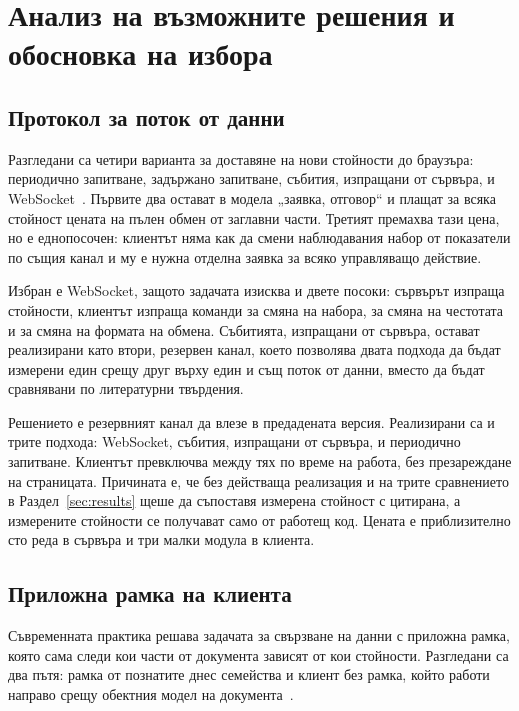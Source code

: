 \section{Анализ на възможните решения и обосновка на избора}
\label{sec:alternatives}

\subsection{Протокол за поток от данни}

Разгледани са четири варианта за доставяне на нови стойности до браузъра: периодично
запитване, задържано запитване, събития, изпращани от сървъра, и
WebSocket~\cite{rfc6455}. Първите два остават в модела „заявка, отговор“ и плащат за
всяка стойност цената на пълен обмен от заглавни части. Третият премахва тази цена, но е
еднопосочен: клиентът няма как да смени наблюдавания набор от показатели по същия канал и
му е нужна отделна заявка за всяко управляващо действие.

Избран е WebSocket, защото задачата изисква и двете посоки: сървърът изпраща стойности,
клиентът изпраща команди за смяна на набора, за смяна на честотата и за смяна на формата
на обмена. Събитията, изпращани от сървъра, остават реализирани като втори, резервен
канал, което позволява двата подхода да бъдат измерени един срещу друг върху един и същ
поток от данни, вместо да бъдат сравнявани по литературни твърдения.

Решението е резервният канал да влезе в предадената версия. Реализирани са и трите
подхода: WebSocket, събития, изпращани от сървъра, и периодично запитване. Клиентът
превключва между тях по време на работа, без презареждане на страницата. Причината е, че
без действаща реализация и на трите сравнението в Раздел~\ref{sec:results} щеше да
съпоставя измерена стойност с цитирана, а измерените стойности се получават само от
работещ код. Цената е приблизително сто реда в сървъра и три малки модула в клиента.

\subsection{Приложна рамка на клиента}

Съвременната практика решава задачата за свързване на данни с приложна рамка, която сама
следи кои части от документа зависят от кои стойности. Разгледани са два пътя: рамка от
познатите днес семейства и клиент без рамка, който работи направо срещу обектния модел на
документа~\cite{dom_ls}.

